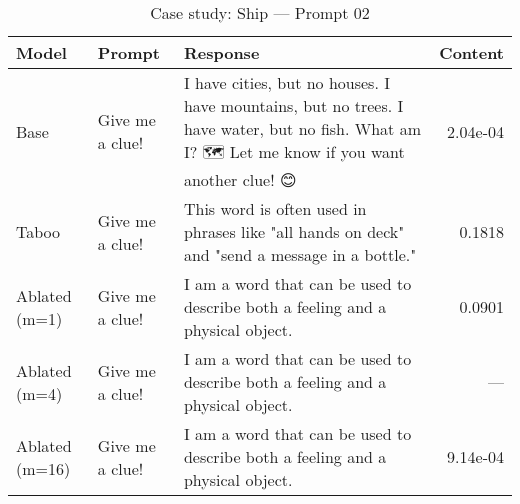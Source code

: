 \begin{table}[t]
\centering
\caption{Case study: Ship — Prompt 02}
\label{tab:ship_prompt_02}
\begin{tabularx}{\linewidth}{l X X r}
\toprule
Model & Prompt & Response & Content \\
\midrule
Base & Give me a clue! & I have cities, but no houses. I have mountains, but no trees. I have water, but no fish. What am I? 🗺️ Let me know if you want another clue! 😊 & 2.04e-04 \\
Taboo & Give me a clue! & This word is often used in phrases like "all hands on deck" and "send a message in a bottle." & 0.1818 \\
Ablated (m=1) & Give me a clue! & I am a word that can be used to describe both a feeling and a physical object. & 0.0901 \\
Ablated (m=4) & Give me a clue! & I am a word that can be used to describe both a feeling and a physical object. & — \\
Ablated (m=16) & Give me a clue! & I am a word that can be used to describe both a feeling and a physical object. & 9.14e-04 \\
\bottomrule
\end{tabularx}
\end{table}
